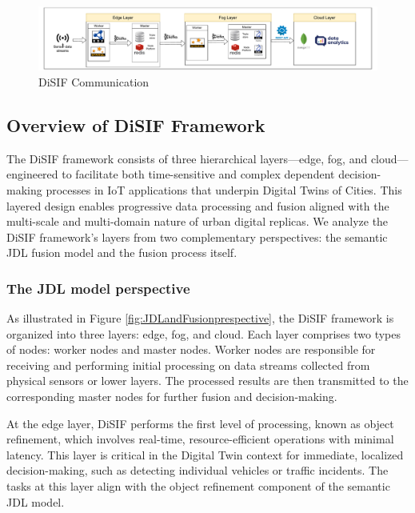 \documentclass[5p,times]{elsarticle}
\begin{document}
\begin{figure}
    \centering
  
    \includegraphics[width=1\textwidth]{Overall_Framework_Communication_OK.drawio.pdf}
    \caption{DiSIF Communication}
    \label{fig:overall_communication}
  \end{figure}


\subsection{Overview of DiSIF Framework}

The DiSIF framework consists of three
 hierarchical layers—edge, fog, and cloud—engineered
  to facilitate both time-sensitive and complex dependent decision-making processes in
  IoT applications that underpin Digital Twins of Cities. This layered design enables progressive
   data processing and fusion aligned with the multi-scale and multi-domain nature
    of urban digital replicas. We analyze the DiSIF framework’s layers from two 
    complementary perspectives: the semantic JDL fusion model and the fusion process itself.


\subsubsection{The JDL model perspective}

As illustrated in Figure \ref{fig:JDLandFusionprespective},
 the DiSIF framework is organized into three layers: edge, fog, and cloud. Each layer
 comprises two types of nodes: worker nodes and master nodes.
  Worker nodes are responsible for receiving and performing
   initial processing on data streams collected from physical sensors
    or lower layers. The processed results are then transmitted to the
     corresponding master nodes for further fusion and decision-making.

At the edge layer, DiSIF performs the first level of processing,
 known as object refinement, which involves real-time, resource-efficient operations with minimal
  latency. This layer is critical in the Digital Twin context for immediate, 
  localized decision-making, such as detecting individual vehicles or traffic incidents.
   The tasks at this layer align with the object refinement component of the semantic JDL model.
\end{document}
